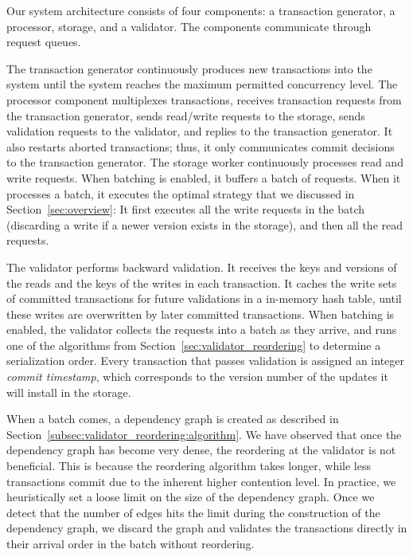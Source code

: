Our system architecture consists of four components: a transaction generator, a processor, storage, and a validator. The components communicate through request queues.

The transaction generator continuously produces new transactions into the system until the system reaches the maximum permitted concurrency level. The processor component multiplexes transactions, receives transaction requests from the transaction generator, sends read/write requests to the storage, sends validation requests to the validator, and replies to the transaction generator. It also restarts aborted transactions; thus, it only communicates commit decisions to the transaction generator. 
The storage worker continuously processes read and write requests. When batching is enabled, it buffers a batch of requests. When it processes a batch, it executes the optimal strategy that we discussed in Section~\ref{sec:overview}: It first executes all the write requests in the batch (discarding a write if a newer version exists in the storage), and then all the read requests. 

The validator performs backward validation. It receives the keys and versions of the reads and the keys of the writes in each transaction. It caches the write sets of committed transactions for future validations in a in-memory hash table, until these writes are overwritten by later committed transactions. 
When batching is enabled, the validator collects the requests into a batch as they arrive, and runs one of the algorithms from Section~\ref{sec:validator_reordering} to determine a serialization order. Every transaction that passes validation is assigned an integer \emph{commit timestamp}, which corresponds to the version number of the updates it will install in the storage.

When a batch comes, a dependency graph is created as described in Section~\ref{subsec:validator_reordering:algorithm}. We have observed that once the dependency graph has become very dense, the reordering at the validator is not beneficial. This is because the reordering algorithm takes longer, while less transactions commit due to the inherent higher contention level. In practice, we heuristically set a loose limit on the size of the dependency graph. Once we detect that the number of edges hits the limit during the construction of the dependency graph, we discard the graph and validates the transactions directly in their arrival order in the batch without reordering.


